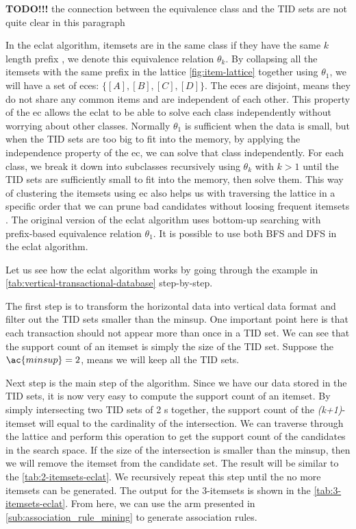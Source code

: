 \textbf{TODO!!!} the connection between the equivalence class and the TID sets are not quite clear in this paragraph

In the \ac{eclat} algorithm, itemsets are in the same class if they have the same $k$ length prefix \citep{zaki2000}, we denote this equivalence relation $\theta_k$.
By collapsing all the itemsets with the same prefix in the lattice \autoref{fig:item-lattice} together using $\theta_1$, we will have a set of \ac{ec}es: $\{[A], [B], [C], [D]\}$.
The \ac{ec}es are disjoint, means they do not share any common items and are independent of each other. %
This property of the \ac{ec} allows the \ac{eclat} to be able to solve each class independently without worrying about other classes.
Normally $\theta_1$ is sufficient when the data is small, but when the TID sets are too big to fit into the memory, by applying the independence property of the \ac{ec}, we can solve that class independently.
For each class, we break it down into subclasses recursively using $\theta_k$ with $k>1$ until the TID sets are sufficiently small to fit into the memory, then solve them.
This way of clustering the itemsets using \ac{ec} also helps us with traversing the lattice in a specific order that we can prune bad candidates without loosing frequent itemsets \citep{zaki2000}.
The original version of the \ac{eclat} algorithm uses bottom-up searching with prefix-based equivalence relation $\theta_1$.
It is possible to use both \ac{BFS} and \ac{DFS} in the \ac{eclat} algorithm.

Let us see how the \ac{eclat} algorithm works by going through the example in \autoref{tab:vertical-transactional-database} step-by-step.

The first step is to transform the horizontal data into vertical data format and filter out the \ac{TID} sets smaller than the \ac{minsup}.
One important point here is that each transaction should not appear more than once in a \ac{TID} set.
We can see that the support count of an itemset is simply the size of the \ac{TID} set.
Suppose the $\ac{minsup}=2$, means we will keep all the \ac{TID} sets.

Next step is the main step of the algorithm.
Since we have our data stored in the \ac{TID} sets, it is now very easy to compute the support count of an itemset.
By simply intersecting two \ac{TID} sets of 2 \kItemset s together, the support count of the \textit{(k+1)}-itemset will equal to the cardinality of the intersection.
We can traverse through the lattice and perform this operation to get the support count of the candidates in the search space.
If the size of the intersection is smaller than the \ac{minsup}, then we will remove the itemset from the candidate set.
The result will be similar to the \autoref{tab:2-itemsets-eclat}.
We recursively repeat this step until the no more itemsets can be generated.
The output for the 3-itemsets is shown in the \autoref{tab:3-itemsets-eclat}.
From here, we can use the \ac{arm} presented in \autoref{sub:association_rule_mining} to generate association rules.

